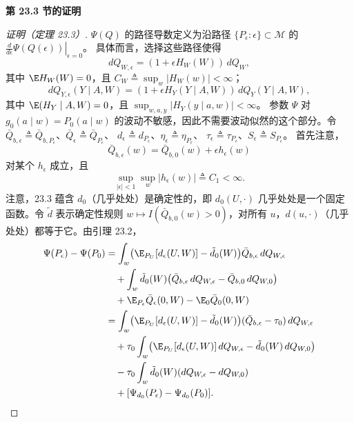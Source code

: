 \noindent\textbf{第 23.3 节的证明}

\begin{proof}[证明（定理 23.3）]
$\Psi(Q)$ 的路径导数定义为沿路径 $\{P_\epsilon:\epsilon\}\subset\mathcal M$ 的
$\left.\frac{d}{d\epsilon}\Psi(Q(\epsilon))\right|_{\epsilon=0}$。
具体而言，选择这些路径使得
\[
 dQ_{W,\epsilon}=(1+\epsilon H_W(W))\,dQ_W,
\]
其中 $\E H_W(W)=0$，且 $C_W\triangleq\sup_w|H_W(w)|<\infty$；
\[
 dQ_{Y,\epsilon}(Y\mid A,W)=(1+\epsilon H_Y(Y\mid A,W))\,dQ_Y(Y\mid A,W),
\]
其中 $\E(H_Y\mid A,W)=0$，且 $\sup_{w,a,y}|H_Y(y\mid a,w)|<\infty$。
参数 $\Psi$ 对 $g_0(a\mid w)=P_0(a\mid w)$ 的波动不敏感，因此不需要波动似然的这个部分。令
$\bar Q_{b,\epsilon}\triangleq\bar Q_{b,P_\epsilon}$、$\bar Q_\epsilon\triangleq\bar Q_{P_\epsilon}$、
$d_\epsilon\triangleq d_{P_\epsilon}$、$\eta_\epsilon\triangleq\eta_{P_\epsilon}$、
$\tau_\epsilon\triangleq\tau_{P_\epsilon}$、$S_\epsilon\triangleq S_{P_\epsilon}$。
首先注意，
\begin{equation}
 \bar Q_{b,\epsilon}(w)=\bar Q_{b,0}(w)+\epsilon h_\epsilon(w)
\tag{23.7}
\end{equation}
对某个 $h_\epsilon$ 成立，且
\begin{equation}
 \sup_{|\epsilon|<1}\sup_w|h_\epsilon(w)|\triangleq C_1<\infty.
\tag{23.8}
\end{equation}
注意，23.3 蕴含 $d_0$（几乎处处）是确定性的，即 $d_0(U,\cdot)$ 几乎处处是一个固定函数。令 $\tilde d$ 表示确定性规则 $w\mapsto I(\bar Q_{b,0}(w)>0)$，对所有 $u$，$d(u,\cdot)$（几乎处处）都等于它。由引理 23.2，
\begin{equation}
\begin{aligned}
 \Psi(P_\epsilon)-\Psi(P_0)
 &=\int_w\bigl(\E_{P_U}[d_\epsilon(U,W)]-\tilde d_0(W)\bigr)
 \bar Q_{b,\epsilon}\,dQ_{W,\epsilon}\\
 &\quad+\int_w\tilde d_0(W)\bigl(\bar Q_{b,\epsilon}\,dQ_{W,\epsilon}
 -\bar Q_{b,0}\,dQ_{W,0}\bigr)\\
 &\quad+\E_{P_\epsilon}\bar Q_\epsilon(0,W)-\E_0\bar Q_0(0,W)\\
 &=\int_w\bigl(\E_{P_U}[d_\epsilon(U,W)]-\tilde d_0(W)\bigr)
 (\bar Q_{b,\epsilon}-\tau_0)\,dQ_{W,\epsilon}\\
 &\quad+\tau_0\int_w\bigl(\E_{P_U}[d_\epsilon(U,W)]\,dQ_{W,\epsilon}
 -\tilde d_0(W)\,dQ_{W,0}\bigr)\\
 &\quad-\tau_0\int_w\tilde d_0(W)(dQ_{W,\epsilon}-dQ_{W,0})\\
 &\quad+[\Psi_{d_0}(P_\epsilon)-\Psi_{d_0}(P_0)].
\end{aligned}

\end{equation}
\end{proof}
